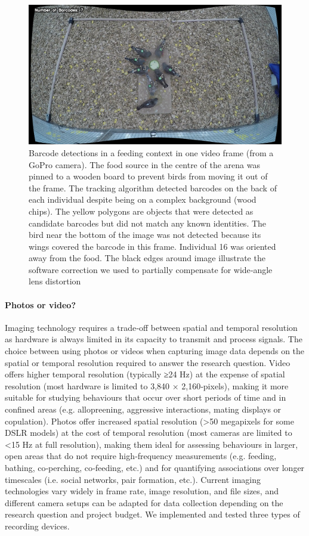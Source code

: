 \documentclass[11pt,a4paper,oneside]{article}
\begin{document}
\begin{figure}
    \centering
    \includegraphics{Graving_IMPRS_Thesis/figures/bird_figure_3.jpg}
    \caption{Barcode detections in a feeding context in one video frame (from a GoPro camera). The food source in the centre of the arena was pinned to a wooden board to prevent birds from moving it out of the frame. The tracking algorithm detected barcodes on the back of each individual despite being on a complex background (wood chips). The yellow polygons are objects that were detected as candidate barcodes but did not match any known identities. The bird near the bottom of the image was not detected because its wings covered the barcode in this frame. Individual 16 was oriented away from the food. The black edges around image illustrate the software correction we used to partially compensate for wide‐angle lens distortion
}
    \label{fig:bird_figure_3}
\end{figure}

\paragraph{Photos or video?}
Imaging technology requires a trade‐off between spatial and temporal resolution as hardware is always limited in its capacity to transmit and process signals. The choice between using photos or videos when capturing image data depends on the spatial or temporal resolution required to answer the research question. Video offers higher temporal resolution (typically ≥24 Hz) at the expense of spatial resolution (most hardware is limited to 3,840 × 2,160‐pixels), making it more suitable for studying behaviours that occur over short periods of time and in confined areas (e.g. allopreening, aggressive interactions, mating displays or copulation). Photos offer increased spatial resolution (>50 megapixels for some DSLR models) at the cost of temporal resolution (most cameras are limited to <15 Hz at full resolution), making them ideal for assessing behaviours in larger, open areas that do not require high‐frequency measurements (e.g. feeding, bathing, co‐perching, co‐feeding, etc.) and for quantifying associations over longer timescales (i.e. social networks, pair formation, etc.). Current imaging technologies vary widely in frame rate, image resolution, and file sizes, and different camera setups can be adapted for data collection depending on the research question and project budget. We implemented and tested three types of recording devices.
\end{document}
